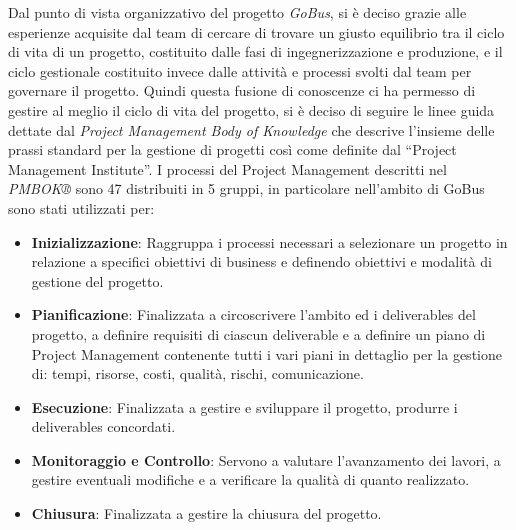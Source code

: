 Dal punto di vista organizzativo del progetto \emph{GoBus}, si è deciso grazie alle esperienze acquisite dal team di cercare di trovare un giusto equilibrio tra il ciclo di vita di un progetto, costituito dalle fasi di ingegnerizzazione e produzione, e il ciclo gestionale costituito invece dalle attività e processi svolti dal team per governare il progetto. Quindi questa fusione di conoscenze ci ha permesso di gestire al meglio il ciclo di vita del progetto, si è deciso di seguire le linee guida dettate dal \emph{Project Management Body of Knowledge} che descrive l’insieme delle prassi standard per la gestione di progetti così come definite dal “Project Management Institute”. I processi del Project Management descritti nel \emph{PMBOK®} \cite{PMBOK} sono 47 distribuiti in 5 gruppi, in particolare nell’ambito di GoBus sono stati utilizzati per:

\begin{itemize}
	\item {\bf{Inizializzazione}}: Raggruppa i processi necessari a selezionare un progetto in relazione a specifici obiettivi di business e definendo obiettivi e modalità di gestione del progetto.
	\item {\bf{Pianificazione}}: Finalizzata a circoscrivere l’ambito ed i deliverables del progetto, a definire requisiti di ciascun deliverable e a definire un piano di Project Management contenente tutti i vari piani in dettaglio per la gestione di: tempi, risorse, costi, qualità, rischi, comunicazione.
	\item {\bf{Esecuzione}}: Finalizzata a gestire e sviluppare il progetto, produrre i deliverables concordati.
	\item  {\bf{Monitoraggio e Controllo}}: Servono a valutare l’avanzamento dei lavori, a gestire eventuali modifiche e a verificare la qualità di quanto realizzato.
	\item {\bf{Chiusura}}: Finalizzata a gestire la chiusura del progetto.
\end{itemize}

